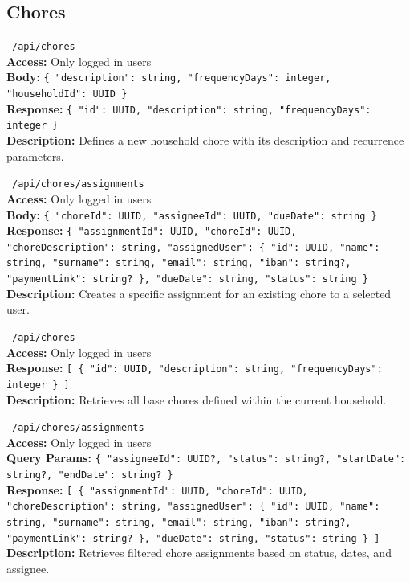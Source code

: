 \subsection{Chores}

\vspace{0.3cm}
\noindent \apiPOST\ \texttt{/api/chores} \\
\textbf{Access:} Only logged in users \\
\textbf{Body:} \texttt{\{ "description": string, "frequencyDays": integer, "householdId": UUID \}} \\
\textbf{Response:} \texttt{\{ "id": UUID, "description": string, "frequencyDays": integer \}} \\
\textbf{Description:} Defines a new household chore with its description and recurrence parameters.

\vspace{0.3cm}
\noindent \apiPOST\ \texttt{/api/chores/assignments} \\
\textbf{Access:} Only logged in users \\
\textbf{Body:} \texttt{\{ "choreId": UUID, "assigneeId": UUID, "dueDate": string \}} \\
\textbf{Response:} \texttt{\{ "assignmentId": UUID, "choreId": UUID, "choreDescription": string, "assignedUser": \{ "id": UUID, "name": string, "surname": string, "email": string, "iban": string?, "paymentLink": string? \}, "dueDate": string, "status": string \}} \\
\textbf{Description:} Creates a specific assignment for an existing chore to a selected user.

\vspace{0.3cm}
\noindent \apiGET\ \texttt{/api/chores} \\
\textbf{Access:} Only logged in users \\
\textbf{Response:} \texttt{[ \{ "id": UUID, "description": string, "frequencyDays": integer \} ]} \\
\textbf{Description:} Retrieves all base chores defined within the current household.

\vspace{0.3cm}
\noindent \apiGET\ \texttt{/api/chores/assignments} \\
\textbf{Access:} Only logged in users \\
\textbf{Query Params:} \texttt{\{ "assigneeId": UUID?, "status": string?, "startDate": string?, "endDate": string? \}} \\
\textbf{Response:} \texttt{[ \{ "assignmentId": UUID, "choreId": UUID, "choreDescription": string, "assignedUser": \{ "id": UUID, "name": string, "surname": string, "email": string, "iban": string?, "paymentLink": string? \}, "dueDate": string, "status": string \} ]} \\
\textbf{Description:} Retrieves filtered chore assignments based on status, dates, and assignee.

